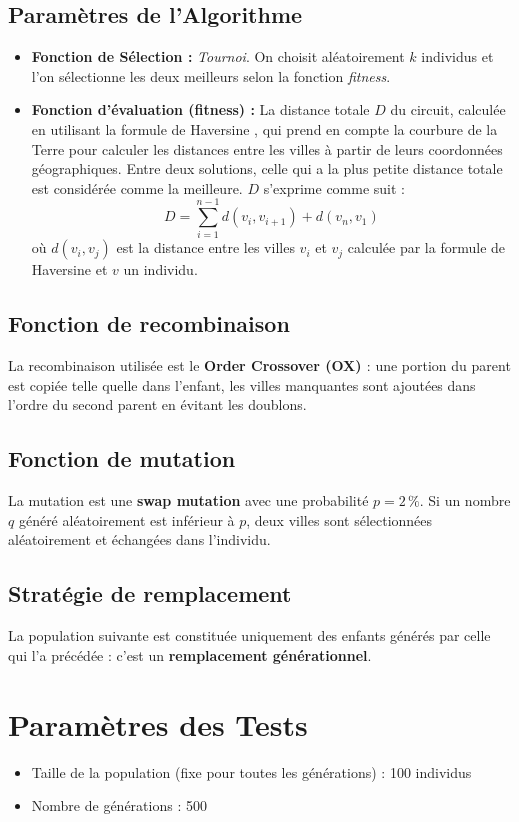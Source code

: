 \documentclass[a4paper,12pt]{article}
\begin{document}
\subsection{Paramètres de l'Algorithme}
\begin{itemize}
    \item \textbf{Fonction de Sélection :} \emph{Tournoi}. On choisit aléatoirement $k$ individus et l'on sélectionne les deux meilleurs selon la fonction \textit{fitness}.
    \item \textbf{Fonction d'évaluation (fitness) :} La distance totale $D$ du circuit, calculée en utilisant la formule de Haversine \cite{haversine}, qui prend en compte la courbure de la Terre pour calculer les distances entre les villes à partir de leurs coordonnées géographiques. Entre deux solutions, celle qui a la plus petite distance totale est considérée comme la meilleure.
    $D$ s'exprime comme suit :
    \[D = \sum_{i=1}^{n-1} d(v_i, v_{i+1}) + d(v_n, v_1)\]
    où $d(v_i, v_j)$ est la distance entre les villes $v_i$ et $v_j$ calculée par la formule de Haversine \cite{haversine} et $v$ un individu.
\end{itemize}

\subsection{Fonction de recombinaison}
La recombinaison utilisée est le \textbf{Order Crossover (OX) \cite{ox_crossover}} : une portion du parent est copiée telle quelle dans l’enfant, les villes manquantes sont ajoutées dans l’ordre du second parent en évitant les doublons.

\subsection{Fonction de mutation}
La mutation est une \textbf{swap mutation} avec une probabilité $p = 2\,\%$. Si un nombre $q$ généré aléatoirement est inférieur à $p$, deux villes sont sélectionnées aléatoirement et échangées dans l’individu.

\subsection{Stratégie de remplacement}
La population suivante est constituée uniquement des enfants générés par celle qui l'a précédée : c'est un \textbf{remplacement générationnel}.

\section{Paramètres des Tests}
\begin{itemize}
    \item Taille de la population (fixe pour toutes les générations) : 100 individus
    \item Nombre de générations : 500
\end{itemize}
\end{document}
